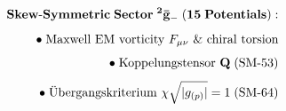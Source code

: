 \documentclass[preview]{standalone}
\begin{document}
\begin{align*}
\special{dvisvgm:raw <g id='unique000'>}\mathbf{Skew\text{-}Symmetric\;Sector\;{}^2\bar{\mathbf{g}}_-\;(15\;Potentials):}\\[5pt]\bullet\;\text{Maxwell EM vorticity }F_{\mu\nu}\text{ \& chiral torsion}\\[4pt]\bullet\;\text{Koppelungstensor }\mathbf{Q}\;(\text{SM-53})\\[4pt]\bullet\;\text{Übergangskriterium }\chi\sqrt{|g_{(p)}|}=1\;(\text{SM-64})\special{dvisvgm:raw </g>}
\end{align*}
\end{document}
